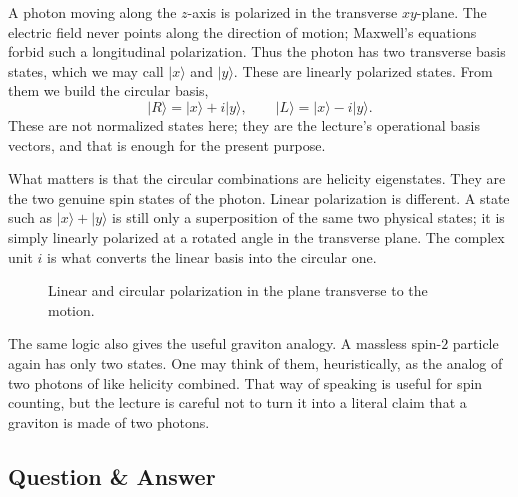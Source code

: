 A photon moving along the \(z\)-axis is polarized in the transverse \(xy\)-plane. The electric field never points along the direction of motion; Maxwell's equations forbid such a longitudinal polarization. Thus the photon has two transverse basis states, which we may call \(|x\rangle\) and \(|y\rangle\). These are linearly polarized states. From them we build the circular basis,
\begin{equation}
|R\rangle=|x\rangle+i|y\rangle,\qquad
|L\rangle=|x\rangle-i|y\rangle.
\end{equation}
These are not normalized states here; they are the lecture's operational basis vectors, and that is enough for the present purpose.

What matters is that the circular combinations are helicity eigenstates. They are the two genuine spin states of the photon. Linear polarization is different. A state such as \(|x\rangle+|y\rangle\) is still only a superposition of the same two physical states; it is simply linearly polarized at a rotated angle in the transverse plane. The complex unit \(i\) is what converts the linear basis into the circular one.

\begin{figure}[t]
\centering
{}
\caption{Linear and circular polarization in the plane transverse to the motion.}
\end{figure}

The same logic also gives the useful graviton analogy. A massless spin-\(2\) particle again has only two states. One may think of them, heuristically, as the analog of two photons of like helicity combined. That way of speaking is useful for spin counting, but the lecture is careful not to turn it into a literal claim that a graviton is made of two photons.

\subsection{Question \& Answer}

